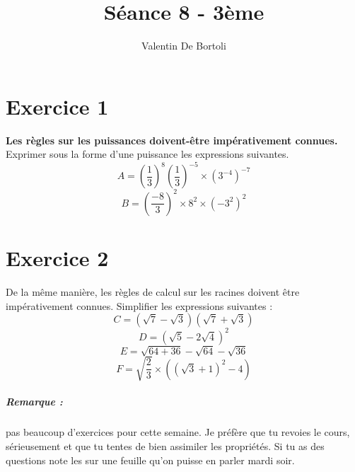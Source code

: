 \documentclass[10pt,a4paper]{article}
\title{Séance 8 - 3ème}
\author{Valentin De Bortoli}
\begin{document}
\maketitle
\section{Exercice 1}
\textbf{Les règles sur les puissances doivent-être impérativement connues.}
Exprimer sous la forme d'une puissance les expressions suivantes.
\begin{equation}
A=\left(\frac{1}{3}\right)^8\left(\frac{1}{3}\right)^{-5}\times (3^{-4})^{-7}
\end{equation}
\begin{equation}
B=\left(\frac{-8}{3}\right)^2\times 8^2 \times (-3^2)^2
\end{equation}
\section{Exercice 2}
De la même manière, les règles de calcul sur les racines doivent être impérativement connues.
Simplifier les expressions suivantes :
\begin{equation}
C=(\sqrt{7}-\sqrt{3})(\sqrt{7}+\sqrt{3})
\end{equation}
\begin{equation}
D=(\sqrt{5}-2\sqrt{4})^2
\end{equation}
\begin{equation}
E=\sqrt{64+36}-\sqrt{64}-\sqrt{36}
\end{equation}
\begin{equation}
F=\sqrt{\frac{2}{3}}\times ((\sqrt{3}+1)^2-4)
\end{equation}
\subparagraph{Remarque :} pas beaucoup d'exercices pour cette semaine. Je préfère que tu revoies le cours, sérieusement et que tu tentes de bien assimiler les propriétés. Si tu as des questions note les sur une feuille qu'on puisse en parler mardi soir. 
\end{document}
